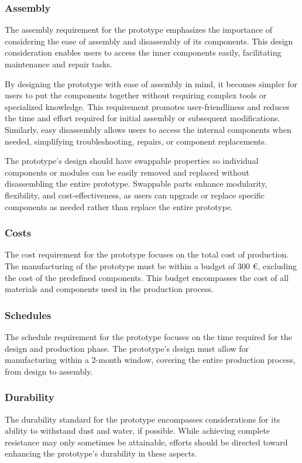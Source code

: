 \subsubsection{Assembly}
The assembly requirement for the prototype emphasizes the importance of considering the ease of assembly and disassembly of its components. This design consideration enables users to access the inner components easily, facilitating maintenance and repair tasks.

By designing the prototype with ease of assembly in mind, it becomes simpler for users to put the components together without requiring complex tools or specialized knowledge. This requirement promotes user-friendliness and reduces the time and effort required for initial assembly or subsequent modifications. Similarly, easy disassembly allows users to access the internal components when needed, simplifying troubleshooting, repairs, or component replacements.

The prototype's design should have swappable properties so individual components or modules can be easily removed and replaced without disassembling the entire prototype. Swappable parts enhance modularity, flexibility, and cost-effectiveness, as users can upgrade or replace specific components as needed rather than replace the entire prototype.

\subsubsection{Costs}
The cost requirement for the prototype focuses on the total cost of production. The manufacturing of the prototype must be within a budget of 300 €, excluding the cost of the predefined components. This budget encompasses the cost of all materials and components used in the production process.

\subsubsection{Schedules}
The schedule requirement for the prototype focuses on the time required for the design and production phase. The prototype's design must allow for manufacturing within a 2-month window, covering the entire production process, from design to assembly.

\subsubsection{Durability}
The durability standard for the prototype encompasses considerations for its ability to withstand dust and water, if possible. While achieving complete resistance may only sometimes be attainable, efforts should be directed toward enhancing the prototype's durability in these aspects.

